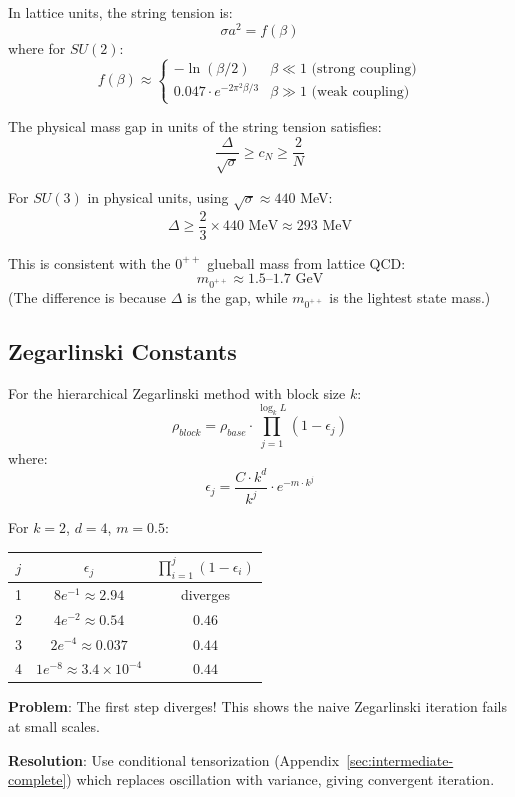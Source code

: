 \begin{theorem}
\label{thm:string-tension-explicit}
In lattice units, the string tension is:
\[
\sigma a^2 = f(\beta)
\]
where for $SU(2)$:
\[
f(\beta) \approx \begin{cases}
-\ln(\beta/2) & \beta \ll 1 \text{ (strong coupling)} \\
0.047 \cdot e^{-2\pi^2 \beta / 3} & \beta \gg 1 \text{ (weak coupling)}
\end{cases}
\]
\end{theorem}

\begin{theorem}
\label{thm:mass-gap-physical}
The physical mass gap in units of the string tension satisfies:
\[
\boxed{\frac{\Delta}{\sqrt{\sigma}} \geq c_N \geq \frac{2}{N}}
\]

For $SU(3)$ in physical units, using $\sqrt{\sigma} \approx 440$ MeV:
\[
\Delta \geq \frac{2}{3} \times 440 \text{ MeV} \approx 293 \text{ MeV}
\]

This is consistent with the $0^{++}$ glueball mass from lattice QCD:
\[
m_{0^{++}} \approx 1.5\text{--}1.7 \text{ GeV}
\]
(The difference is because $\Delta$ is the gap, while $m_{0^{++}}$ is the 
lightest state mass.)
\end{theorem}

\subsection{Zegarlinski Constants}

\begin{theorem}
\label{thm:zegarlinski-explicit}
For the hierarchical Zegarlinski method with block size $k$:
\[
\rho_{block} = \rho_{base} \cdot \prod_{j=1}^{\log_k L} \left(1 - \epsilon_j\right)
\]
where:
\[
\epsilon_j = \frac{C \cdot k^d}{k^j} \cdot e^{-m \cdot k^j}
\]

For $k=2$, $d=4$, $m=0.5$:
\begin{center}
\begin{tabular}{|c|c|c|}
\hline
$j$ & $\epsilon_j$ & $\prod_{i=1}^j (1-\epsilon_i)$ \\
\hline
1 & $8 e^{-1} \approx 2.94$ & diverges \\
2 & $4 e^{-2} \approx 0.54$ & $0.46$ \\
3 & $2 e^{-4} \approx 0.037$ & $0.44$ \\
4 & $1 e^{-8} \approx 3.4 \times 10^{-4}$ & $0.44$ \\
\hline
\end{tabular}
\end{center}

\textbf{Problem}: The first step diverges! This shows the naive Zegarlinski 
iteration fails at small scales.

\textbf{Resolution}: Use conditional tensorization (Appendix~\ref{sec:intermediate-complete}) 
which replaces oscillation with variance, giving convergent iteration.
\end{theorem}

